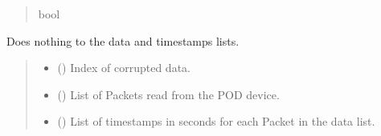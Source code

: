 \documentclass[letterpaper,10pt,english]{sphinxmanual}
\begin{document}
\begin{fulllineitems}
\begin{fulllineitems}
\begin{quote}
\begin{description}
\sphinxAtStartPar
bool

\end{description}\end{quote}

\end{fulllineitems}


\begin{fulllineitems}
\label{\detokenize{Morelia.Stream.Collect:Morelia.Stream.Collect.DataHose.Hose._Filter_DoNothing}}
\pysigstartsignatures
{}
\pysigstopsignatures
\sphinxAtStartPar
Does nothing to the data and timestamps lists.
\begin{quote}\begin{description}
\begin{itemize}
\item {} 
\sphinxAtStartPar
{} () \textendash{} Index of corrupted data.

\item {} 
\sphinxAtStartPar
{} (\sphinxstyleliteralemphasis{\sphinxupquote{{[}}}{\hyperref[\detokenize{Morelia.Packets:Morelia.Packets.Packet.Packet}]{\sphinxcrossref{\sphinxstyleliteralemphasis{\sphinxupquote{Packet}}}}}\sphinxstyleliteralemphasis{\sphinxupquote{ | }}\sphinxstyleliteralemphasis{\sphinxupquote{{]}}}) \textendash{} List of Packets read from the POD device.

\item {} 
\sphinxAtStartPar
{} (\sphinxstyleliteralemphasis{\sphinxupquote{{[}}}\sphinxstyleliteralemphasis{\sphinxupquote{{]}}}) \textendash{} List of timestamps in seconds for each Packet                 in the data list.


\end{itemize}
\end{description}
\end{quote}
\end{fulllineitems}
\end{fulllineitems}
\end{document}
